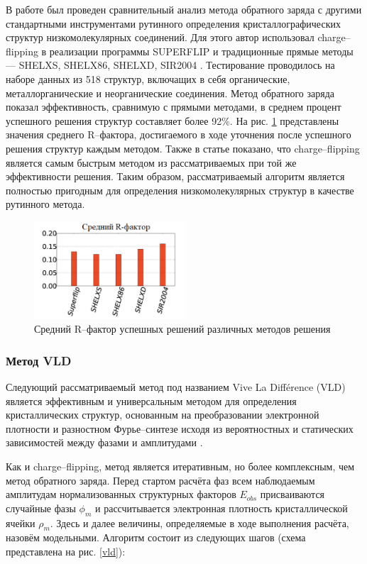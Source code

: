В работе \cite{van_der_lee_charge_2013} был проведен сравнительный анализ метода обратного заряда с другими стандартными инструментами рутинного определения кристаллографических структур низкомолекулярных соединений. Для этого автор использовал charge--flipping в реализации программы SUPERFLIP \cite{palatinus_it_2007} и традиционные прямые методы --- SHELXS, SHELX86, SHELXD, SIR2004 \cite{sheldrick_shelxt_2015}. Тестирование проводилось на наборе данных из 518 структур, включащих в себя органические, металлорганические и неорганические соединения. Метод обратного заряда показал эффективность, сравнимую с прямыми методами, в среднем процент успешного решения структур составляет более 92\%. На рис. \ref{charge_direct} представлены значения среднего R--фактора, достигаемого в ходе уточнения после успешного решения структур каждым методом. Также в статье показано, что charge--flipping является самым быстрым методом из рассматриваемых при той же эффективности решения. Таким образом, рассматриваемый алгоритм является полностью пригодным для определения низкомолекулярных структур в качестве рутинного метода.


\begin{figure}[H]
	\centering
	\includegraphics[width=0.5\textwidth]{figures/charge_direct.png}\hfill
	\caption{Средний R--фактор успешных решений различных методов решения}
	\label{charge_direct}
\end{figure}

\subsubsection{Метод VLD}

Следующий рассматриваемый метод под названием Vive La Diff\'erence (VLD) является эффективным и универсальным методом для определения кристаллических структур, основанным на преобразовании электронной плотности и разностном Фурье--синтезе исходя из вероятностных и статических зависимостей между фазами и амплитудами \cite{burla_random_2010}. 

Как и charge--flipping, метод является итеративным, но более комплексным, чем метод обратного заряда. Перед стартом расчёта фаз всем наблюдаемым амплитудам нормализованных структурных факторов $E_{obs}$ присваиваются случайные фазы $\phi_m$ и рассчитывается электронная плотность кристаллической ячейки $\rho_m$. Здесь и далее величины, определяемые в ходе выполнения расчёта, назовём модельными. Алгоритм состоит из следующих шагов (схема представлена на рис. \ref{vld}):

